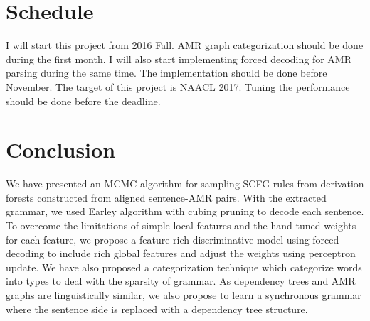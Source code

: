 \section{Schedule}
I will start this project from 2016 Fall. AMR graph categorization should be done during the first month. I will also start implementing forced decoding for AMR parsing during the same time.
The implementation should be done before November. The target of this project is NAACL 2017. Tuning the performance should be done before the deadline.
\section{Conclusion}
We have presented an MCMC algorithm for sampling SCFG rules from derivation forests constructed from aligned sentence-AMR pairs.
With the extracted grammar, we used Earley algorithm with cubing pruning to decode each sentence. To overcome the limitations of
simple local features and the hand-tuned weights for each feature, we propose a feature-rich discriminative model using forced decoding to
include rich global features and adjust the weights using perceptron update.
We have also proposed a categorization technique which categorize words into types to deal with the sparsity of grammar. 
As dependency trees and AMR graphs are linguistically similar, we also propose to learn a synchronous grammar where the sentence side is replaced with a dependency tree structure.
